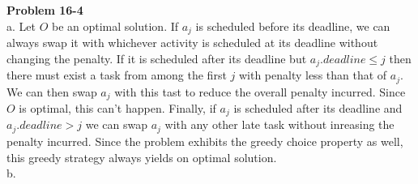 \documentclass{article}
\begin{document}
\noindent\textbf{Problem 16-4}\\

a. Let $O$ be an optimal solution.  If $a_j$ is scheduled before its deadline, we can always swap it with whichever activity is scheduled at its deadline without changing the penalty.  If it is scheduled after its deadline but $a_j.deadline \leq j$ then there must exist a task from among the first $j$ with penalty less than that of $a_j$.  We can then swap $a_j$ with this tast to reduce the overall penalty incurred.  Since $O$ is optimal, this can't happen.  Finally, if $a_j$ is scheduled after its deadline and $a_j.deadline > j$ we can swap $a_j$ with any other late task without inreasing the penalty incurred.  Since the problem exhibits the greedy choice property as well, this greedy strategy always yields on optimal solution. \\

b. %
\end{document}
